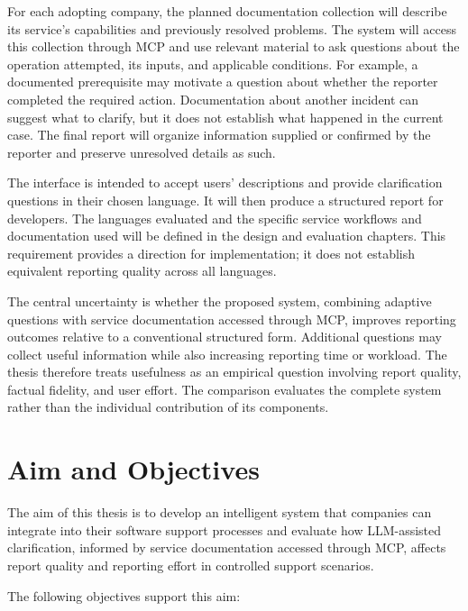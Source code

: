For each adopting company, the planned documentation collection will describe its service's capabilities and previously resolved problems. The system will access this collection through MCP and use relevant material to ask questions about the operation attempted, its inputs, and applicable conditions. For example, a documented prerequisite may motivate a question about whether the reporter completed the required action. Documentation about another incident can suggest what to clarify, but it does not establish what happened in the current case. The final report will organize information supplied or confirmed by the reporter and preserve unresolved details as such.

The interface is intended to accept users' descriptions and provide clarification questions in their chosen language. It will then produce a structured report for developers. The languages evaluated and the specific service workflows and documentation used will be defined in the design and evaluation chapters. This requirement provides a direction for implementation; it does not establish equivalent reporting quality across all languages.

The central uncertainty is whether the proposed system, combining adaptive questions with service documentation accessed through MCP, improves reporting outcomes relative to a conventional structured form. Additional questions may collect useful information while also increasing reporting time or workload. The thesis therefore treats usefulness as an empirical question involving report quality, factual fidelity, and user effort. The comparison evaluates the complete system rather than the individual contribution of its components.

\section{Aim and Objectives}
\label{sec:aim}

The aim of this thesis is to develop an intelligent system that companies can integrate into their software support processes and evaluate how LLM-assisted clarification, informed by service documentation accessed through MCP, affects report quality and reporting effort in controlled support scenarios.

The following objectives support this aim:

